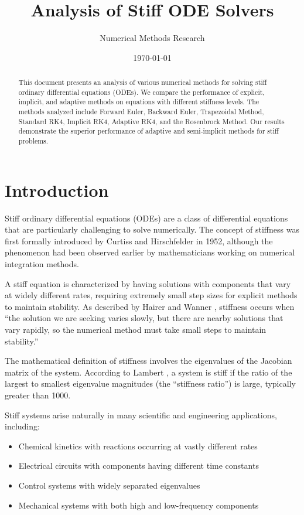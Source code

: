 \documentclass[11pt,a4paper]{article}
\title{Analysis of Stiff ODE Solvers}
\author{Numerical Methods Research}
\date{\today}
\begin{document}
\maketitle

\begin{abstract}
This document presents an analysis of various numerical methods for solving stiff ordinary differential equations (ODEs). We compare the performance of explicit, implicit, and adaptive methods on equations with different stiffness levels. The methods analyzed include Forward Euler, Backward Euler, Trapezoidal Method, Standard RK4, Implicit RK4, Adaptive RK4, and the Rosenbrock Method. Our results demonstrate the superior performance of adaptive and semi-implicit methods for stiff problems.
\end{abstract}

\tableofcontents

\section{Introduction}

Stiff ordinary differential equations (ODEs) are a class of differential equations that are particularly challenging to solve numerically. The concept of stiffness was first formally introduced by Curtiss and Hirschfelder \cite{curtiss1952integration} in 1952, although the phenomenon had been observed earlier by mathematicians working on numerical integration methods.

A stiff equation is characterized by having solutions with components that vary at widely different rates, requiring extremely small step sizes for explicit methods to maintain stability. As described by Hairer and Wanner \cite{hairer1996solving}, stiffness occurs when ``the solution we are seeking varies slowly, but there are nearby solutions that vary rapidly, so the numerical method must take small steps to maintain stability.'' 

The mathematical definition of stiffness involves the eigenvalues of the Jacobian matrix of the system. According to Lambert \cite{lambert1991numerical}, a system is stiff if the ratio of the largest to smallest eigenvalue magnitudes (the ``stiffness ratio'') is large, typically greater than 1000.

Stiff systems arise naturally in many scientific and engineering applications, including:
\begin{itemize}
    \item Chemical kinetics with reactions occurring at vastly different rates \cite{gear1971numerical}
    \item Electrical circuits with components having different time constants \cite{shampine1979conservation}
    \item Control systems with widely separated eigenvalues \cite{ascher1998computer}
    \item Mechanical systems with both high and low-frequency components \cite{butcher2008numerical}
\end{itemize}
\end{document}
